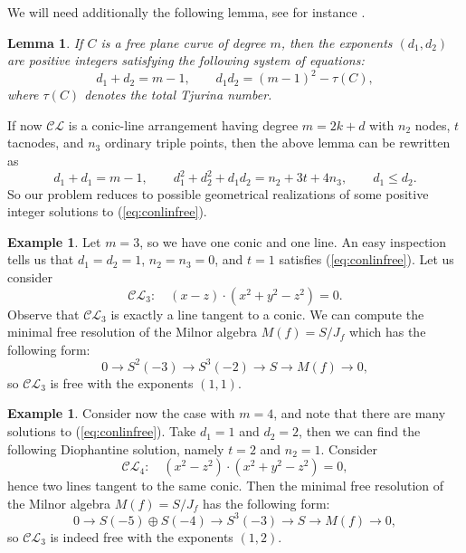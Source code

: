 \documentclass[12pt]{amsart}
\theoremstyle{plain}
\newtheorem{lem}[subsection]{Lemma}
\theoremstyle{definition}
\newtheorem{ex}[subsection]{Example}
\numberwithin{equation}{section}
\begin{document}
We will need additionally the following lemma,  see for instance \cite[Lemma 4.4]{DimcaSernesi}.
\begin{lem}
 \label{lemF}
If $C$ is a free plane curve of degree $m$, then the exponents $(d_{1},d_{2})$ are positive integers satisfying the following system of equations:
$$d_{1}+d_{2} = m-1, \quad \quad d_{1}d_{2} = (m-1)^{2} - \tau(C),$$
where $\tau(C)$ denotes the total Tjurina number.
\end{lem}
If now $\mathcal{CL}$ is a conic-line arrangement having degree $m = 2k + d$ with $n_{2}$ nodes, $t$ tacnodes, and $n_{3}$ ordinary triple points, then the above lemma can be rewritten as
\begin{equation}
\label{eq:conlinfree}
d_{1} + d_{1} = m-1, \quad \quad d_{1}^{2} + d_{2}^{2} + d_{1}d_{2} = n_{2} + 3t + 4n_{3}, \quad \quad d_{1} \leq d_{2}.
\end{equation}
So our problem reduces to possible geometrical realizations of some positive integer solutions to (\ref{eq:conlinfree}). 
\begin{ex}
\label{ex5.3}
Let $m=3$, so we have one conic and one line. An easy inspection tells us that $d_{1} = d_{2}=1$, $n_{2} = n_{3} = 0$, and $t=1$ satisfies (\ref{eq:conlinfree}). Let us consider
$$\mathcal{CL}_{3} : \quad (x-z)\cdot (x^{2} + y^{2} - z^{2}) = 0.$$
Observe that $\mathcal{CL}_{3}$ is exactly a line tangent to a conic.
We can compute the minimal free resolution of the Milnor algebra $M(f) = S/J_{f}$ which has the following form:
$$0 \rightarrow S^{2}(-3) \rightarrow S^{3}(-2) \rightarrow S \rightarrow M(f) \rightarrow 0,$$
so $\mathcal{CL}_{3}$ is free with the exponents $(1,1)$.
\end{ex}
\begin{ex}
\label{ex5.4}
Consider now the case with $m=4$, and note that there are many solutions to (\ref{eq:conlinfree}). Take $d_{1} = 1$ and $d_{2}=2$, then we can find the following Diophantine solution, namely $t=2$ and $n_{2}=1$.  Consider
$$\mathcal{CL}_{4} : \quad (x^{2}-z^{2})\cdot (x^{2} + y^{2} - z^{2}) = 0,$$
hence two lines tangent to the same conic.
Then the minimal free resolution of the Milnor algebra $M(f) = S/J_{f}$ has the following form:
$$0 \rightarrow S(-5)\oplus S(-4) \rightarrow S^{3}(-3) \rightarrow S \rightarrow M(f) \rightarrow 0,$$
so $\mathcal{CL}_{3}$ is indeed free with the exponents $(1,2)$.
\end{ex}
\end{document}
